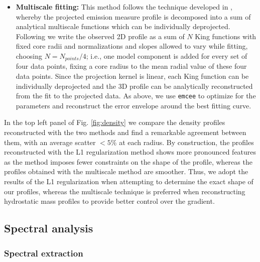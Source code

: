 \documentclass[traditabstract   ]{aa} %
\begin{document}
\begin{itemize}
\item \textbf{Multiscale fitting:} This method follows the technique developed in \citet{eckert16}, whereby the projected emission measure profile is decomposed into a sum of analytical multiscale functions which can be individually deprojected. Following \citet{eckert16} we write the observed 2D profile as a sum of $N$ King functions with fixed core radii and normalizations and slopes allowed to vary while fitting, choosing $N=N_{points}/4$; i.e., one model component is added for every set of four data points{, fixing a core radius to the mean radial value of these four data points}. Since the projection kernel is linear, each King function can be individually deprojected and the 3D profile can be analytically reconstructed from the fit to the projected data. As above, we use \texttt{emcee} to optimize for the parameters and reconstruct the error envelope around the best fitting curve.
\end{itemize}

In the top left panel of Fig. \ref{fig:density} we compare the density profiles reconstructed with the two methods and find a remarkable agreement between them, { with an average scatter} $<5\%$ at each radius. By construction, the profiles reconstructed with the L1 regularization method shows more pronounced features as the method imposes fewer constraints on the shape of the profile, whereas the profiles obtained with the multiscale method are smoother. Thus, we adopt the results of the L1 regularization when attempting to determine the exact shape of our profiles, whereas the multiscale technique is preferred when reconstructing hydrostatic mass profiles to provide better control over the gradient.

\subsection{Spectral analysis}
\label{sec:spec}

\subsubsection{Spectral extraction}
\label{sec:red_spec}
\end{document}
